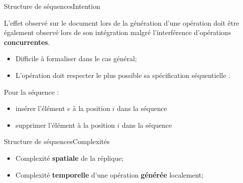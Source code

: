 \begin{frame}{Structure de séquences}{Intention}
  
  L'effet observé sur le document lors de la génération d'une opération doit
  être également observé lors de son intégration malgré l'interférence
  d'opérations \textbf{concurrentes}.

  \vspace{0.5cm}

  \begin{itemize}
  \item Difficile à formaliser dans le cas général;
  \item L'opération doit respecter le plus possible sa spécification séquentielle \REF.
  \end{itemize}

  \vspace{0.5cm}
  
  Pour la séquence :
  \begin{itemize}
  \item \og insérer l'élément $e$ à la position $i$ dans la séquence \fg
  \item \og supprimer l'élément à la position $i$ dans la séquence \fg
  \end{itemize}

  \vspace{0.5cm}

  \begin{itemize}
  \end{itemize}
  
\end{frame}


\begin{frame}{Structure de séquences}{Complexités}

\begin{itemize}
\item Complexité \textbf{spatiale} de la réplique;
\item Complexité \textbf{temporelle} d'une opération \textbf{générée} localement;
\end{itemize}

\end{frame}


